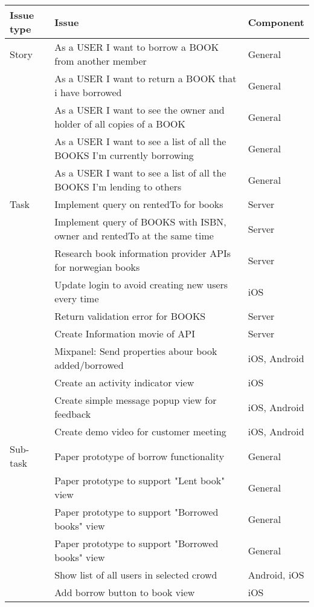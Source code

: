 \begin{longtable}{|L{2cm}|L{10cm}|L{3cm}|}
 \hline
\textbf{Issue type} & \textbf{Issue} & \textbf{Component} \\
 \hline
Story & As a USER I want to borrow a BOOK from another member & General \\
 \hline
 & As a USER I want to return a BOOK that i have borrowed & General \\
  \hline
 & As a USER I want to see the owner and holder of all copies of a BOOK & General \\
  \hline
 & As a USER I want to see a list of all the BOOKS I'm currently borrowing & General \\
  \hline
 & As a USER I want to see a list of all the BOOKS I'm lending to others & General \\
  \hline
Task & Implement query on rentedTo for books & Server \\
 \hline
 & Implement query of BOOKS with ISBN, owner and rentedTo at the same time & Server \\
  \hline
 & Research book information provider APIs for norwegian books & Server \\
  \hline
 & Update login to avoid creating new users every time & iOS \\
  \hline
 & Return validation error for BOOKS & Server \\
  \hline
 & Create Information movie of API & Server \\
  \hline
 & Mixpanel: Send properties abour book added/borrowed & iOS, Android \\
  \hline
 & Create an activity indicator view & iOS \\
  \hline
 & Create simple message popup view for feedback & iOS, Android \\
  \hline
 & Create demo video for customer meeting & iOS, Android \\
  \hline
Sub-task & Paper prototype of borrow functionality & General \\
 \hline
 & Paper prototype to support "Lent book" view & General \\
  \hline
 & Paper prototype to support "Borrowed books" view & General \\
  \hline
 & Paper prototype to support "Borrowed books" view & General \\
  \hline
 & Show list of all users in selected crowd & Android, iOS \\
  \hline
 & Add borrow button to book view & iOS \\

\end{longtable}
